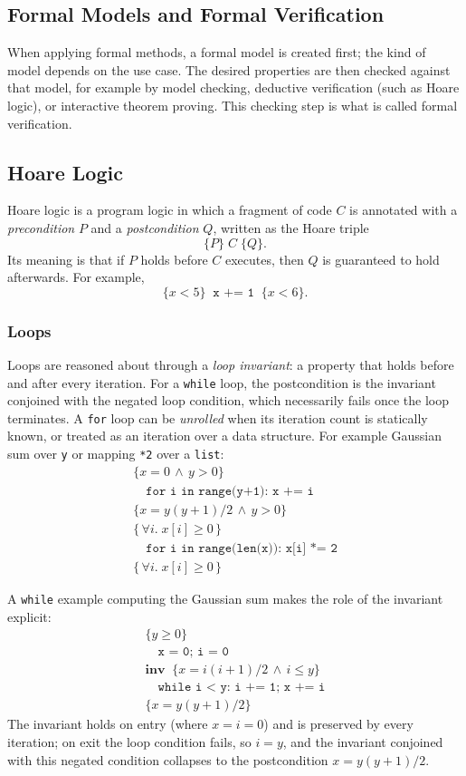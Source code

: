 \documentclass[conference]{IEEEtran}
\begin{document}
\subsection{Formal Models and Formal Verification}
When applying formal methods, a formal model is created first; the kind of model depends on the use case. The desired properties are then checked against that model, for example by model checking, deductive verification (such as Hoare logic), or interactive theorem proving. This checking step is what is called formal verification.

\subsection{Hoare Logic}

Hoare logic is a program logic in which a fragment of code $C$ is annotated with a \emph{precondition} $P$ and a \emph{postcondition} $Q$, written as the Hoare triple
\[
  \{P\}\; C \;\{Q\}.
\]
Its meaning is that if $P$ holds before $C$ executes, then $Q$ is guaranteed to hold afterwards. For example,
\[
  \{x < 5\}\;\; \texttt{x += 1} \;\;\{x < 6\}.
\]

\subsubsection{\textbf{Loops}}
Loops are reasoned about through a \emph{loop invariant}: a property that holds before and after every iteration. For a \texttt{while} loop, the postcondition is the invariant conjoined with the negated loop condition, which necessarily fails once the loop terminates. A \texttt{for} loop can be \emph{unrolled} when its iteration count is statically known, or treated as an iteration over a data structure. For example Gaussian sum over \texttt{y} or mapping \texttt{*2} over a \texttt{list}:
\[
  \begin{array}{l}
    \{x = 0 \,\land\, y > 0\} \\[2pt]
    \quad \texttt{for i in range(y+1): x += i} \\[2pt]
    \{x = y(y+1)/2 \,\land\, y > 0\} \\[9pt]
    \{\,\forall i.\; x[i] \ge 0\,\} \\[2pt]
    \quad \texttt{for i in range(len(x)): x[i] *= 2} \\[2pt]
    \{\,\forall i.\; x[i] \ge 0\,\}
  \end{array}
\]

A \texttt{while} example computing the Gaussian sum makes the role of the invariant explicit:
\[
  \begin{array}{l}
    \{y \ge 0\} \\[2pt]
    \quad \texttt{x = 0; i = 0} \\[4pt]
    \textbf{inv}\;\; \{x = i(i+1)/2 \,\land\, i \le y\} \\[2pt]
    \quad \texttt{while i < y: i += 1; x += i} \\[4pt]
    \{x = y(y+1)/2\}
  \end{array}
\]
The invariant holds on entry (where $x = i = 0$) and is preserved by every iteration; on exit the loop condition fails, so $i = y$, and the invariant conjoined with this negated condition collapses to the postcondition $x = y(y+1)/2$.
\end{document}
